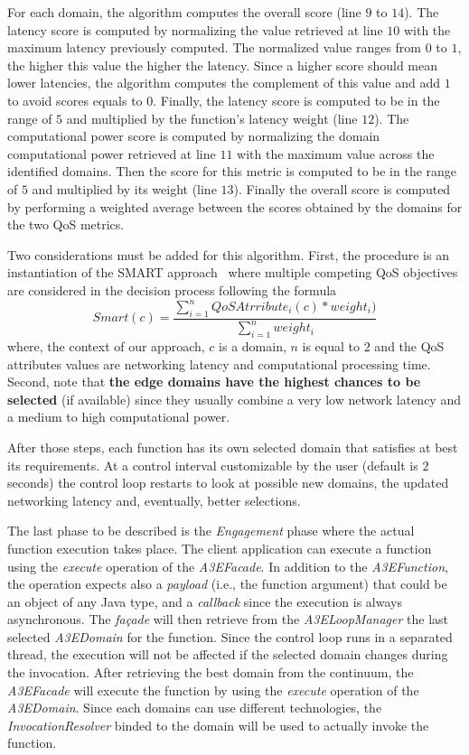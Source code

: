 For each domain, the algorithm computes the overall score (line  $9$ to $14$). The latency score is computed by normalizing the value retrieved at line $10$ with the maximum latency previously computed. The normalized value ranges from $0$ to $1$, the higher this value the higher the latency. Since a higher score should mean lower latencies, the algorithm computes the complement of this value and add $1$ to avoid scores equals to $0$. Finally, the latency score is computed to be in the range of $5$ and multiplied by the function's latency weight (line $12$). The computational power score is computed by normalizing the domain computational power retrieved at line $11$ with the  maximum value across the identified domains. Then the score for this metric is computed to be in the range of $5$ and multiplied by its weight (line $13$). Finally the overall score is computed by performing a weighted average between the scores obtained by the domains for the two QoS metrics.

Two considerations must be added for this algorithm. First, the procedure is an instantiation of the SMART approach~\cite{Olson1996} where multiple competing QoS objectives are considered in the decision process following the formula
\begin{equation}
Smart(c) = \frac{\sum_{i=1}^{n} QoSAtrribute_i(c)*weight_i)}{\sum_{i=1}^{n}weight_i} 
\end{equation}
where, the context of our approach, $c$ is a domain, $n$ is equal to $2$ and the QoS attributes values are networking latency and computational processing time.
Second, note that \textbf{the edge domains have the highest chances to be selected} (if available) since they usually combine a very low network latency and a medium to high computational power. 

After those steps, each function has its own selected domain that satisfies at best its requirements. At a control interval customizable by the user (default is $2$ seconds) the control loop restarts to look at possible new domains, the updated networking latency and, eventually, better selections.

The last phase to be described is the \textit{Engagement} phase where the actual function execution takes place. The client application can execute a function using the \textit{execute} operation of the  \textit{A3EFacade}. In addition to the \textit{A3EFunction}, the operation expects also a \textit{payload} (i.e., the function argument) that could be an object of any Java type, and a \textit{callback} since the execution is always asynchronous. The \textit{fa\c{c}ade} will then retrieve from the \textit{A3ELoopManager} the last selected \textit{A3EDomain} for the function. Since the control loop runs in a separated thread, the execution will not be affected if the selected domain changes during the invocation. After retrieving the best domain from the continuum, the \textit{A3EFacade} will execute the function by using the \textit{execute} operation of the \textit{A3EDomain}. Since each domains can use different technologies, the \textit{InvocationResolver} binded to the domain will be used to actually invoke the function. 

